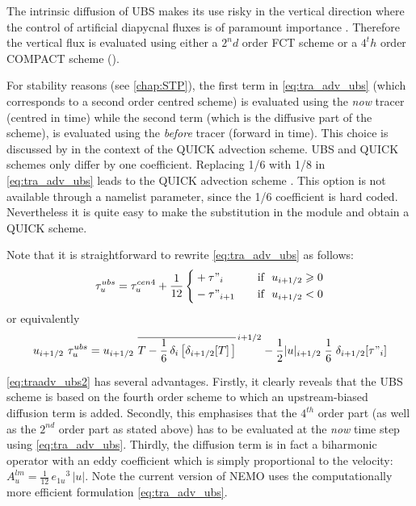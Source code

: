 \documentclass[../tex_main/NEMO_manual]{subfiles}
\begin{document}
The intrinsic diffusion of UBS makes its use risky in the vertical direction 
where the control of artificial diapycnal fluxes is of paramount importance \citep{Shchepetkin_McWilliams_OM05, Demange_PhD2014}. 
Therefore the vertical flux is evaluated using either a $2^nd$ order FCT scheme 
or a $4^th$ order COMPACT scheme ().

For stability reasons  (see \autoref{chap:STP}),
the first term  in \autoref{eq:tra_adv_ubs} (which corresponds to a second order 
centred scheme) is evaluated using the \textit{now} tracer (centred in time) 
while the second term (which is the diffusive part of the scheme), is 
evaluated using the \textit{before} tracer (forward in time). 
This choice is discussed by \citet{Webb_al_JAOT98} in the context of the 
QUICK advection scheme. UBS and QUICK schemes only differ 
by one coefficient. Replacing 1/6 with 1/8 in \autoref{eq:tra_adv_ubs} 
leads to the QUICK advection scheme \citep{Webb_al_JAOT98}. 
This option is not available through a namelist parameter, since the 
1/6 coefficient is hard coded. Nevertheless it is quite easy to make the 
substitution in the  module and obtain a QUICK scheme.

Note that it is straightforward to rewrite \autoref{eq:tra_adv_ubs} as follows:
\begin{equation} \label{eq:traadv_ubs2}
\tau _u^{ubs} = \tau _u^{cen4} + \frac{1}{12} \left\{	 
   \begin{aligned}
	& + \tau"_i			& \quad \text{if }\ u_{i+1/2} \geqslant 0 \\
	&  - \tau"_{i+1}		& \quad \text{if }\ u_{i+1/2}       <       0
   \end{aligned}    \right.
\end{equation}
or equivalently 
\begin{equation} \label{eq:traadv_ubs2b}
u_{i+1/2} \ \tau _u^{ubs} 
=u_{i+1/2} \ \overline{ T - \frac{1}{6}\,\delta _i\left[ \delta_{i+1/2}[T] \,\right] }^{\,i+1/2}
- \frac{1}{2} |u|_{i+1/2} \;\frac{1}{6} \;\delta_{i+1/2}[\tau"_i]
\end{equation}

\autoref{eq:traadv_ubs2} has several advantages. Firstly, it clearly reveals 
that the UBS scheme is based on the fourth order scheme to which an 
upstream-biased diffusion term is added. Secondly, this emphasises that the 
$4^{th}$ order part (as well as the $2^{nd}$ order part as stated above) has 
to be evaluated at the \emph{now} time step using \autoref{eq:tra_adv_ubs}. 
Thirdly, the diffusion term is in fact a biharmonic operator with an eddy 
coefficient which is simply proportional to the velocity:
 $A_u^{lm}= \frac{1}{12}\,{e_{1u}}^3\,|u|$. Note the current version of NEMO uses 
the computationally more efficient formulation \autoref{eq:tra_adv_ubs}.
\end{document}

